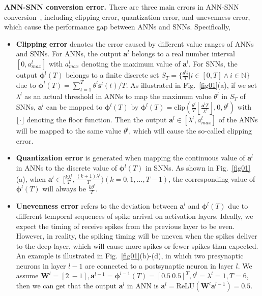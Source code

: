 \documentclass[letterpaper]{article} %
\begin{document}
\noindent
\textbf{ANN-SNN conversion error.}
There are three main errors in ANN-SNN conversion~\cite{bu2022optimal}, including clipping error, quantization error, and unevenness error, which cause the performance gap between ANNs and SNNs. Specifically,
\begin{itemize}
    \item[$\bullet$] \textbf{Clipping error} denotes the error caused by different value ranges of ANNs and SNNs. For ANNs, the output $\boldsymbol{a}^l$  belongs to a real number interval $[0,a_{max}^{l}]$ with $a_{max}^{l}$ denoting the maximum value of  $\boldsymbol{a}^l$. For SNNs,  the output $\boldsymbol{\phi}^l(T)$ belongs to a finite discrete set $S_T = \{ \frac{{\theta}^l i}{T} | i\in [0,T] \wedge  i\in \mathbb{N} \}$ due to $\boldsymbol{\phi}^l(T) = \sum\limits_{t=1}^T{\theta}^{l} \boldsymbol{s}^{l}(t) /T$. As illustrated in Fig.~\ref{fig01}(a), if we set $\lambda^l$ as an actual threshold in ANNs to map the maximum value ${\theta}^l$ in $S_T$ of SNNs, $\boldsymbol{a}^l$ can be mapped to $\boldsymbol{\phi}^l(T)$ by $\bm{\phi}^l(T)=\text{clip} \left(   \frac{ \theta^l}{T} \left \lfloor \frac{\bm{a}^{l} T}{\lambda^l}     \right \rfloor, 0, \theta^l  \right)$ with $\lfloor \cdot \rfloor$ denoting the floor function.
    Then the output $\boldsymbol{a}^l\in [\lambda^l, {a}_{max}^l]$ of the ANNs will be mapped to the same value ${\theta}^l$, which will cause the so-called clipping error.
    \item[$\bullet$] \textbf{Quantization error} is generated when mapping the continuous value of $\boldsymbol{a}^l$ in ANNs to the discrete value of $\boldsymbol{\phi}^l(T)$ in SNNs. As shown in Fig.~\ref{fig01}(a), when $\boldsymbol{a}^l\in[\frac{k\lambda^l}{T},\frac{(k+1)\lambda^l}{T})(k=0,1,...,T-1)$, the corresponding value of $\boldsymbol{\phi}^l(T)$ will always be $\frac{k{\theta}^l}{T}$.
    \item[$\bullet$] \textbf{Unevenness error} refers to the deviation between $\boldsymbol{a}^l$ and $\boldsymbol{\phi}^l(T)$ due to different temporal sequences of spike arrival on activation layers. Ideally, we expect the timing of receive spikes from the previous layer to be even. However, in reality, the spiking timing will be uneven when the spikes deliver to the deep layer, which will cause more spikes or fewer spikes than expected. An example is illustrated in Fig.~\ref{fig01}(b)-(d), in which two presynaptic neurons in layer $l-1$ are connected to a postsynaptic neuron in layer $l$. We assume $\boldsymbol{W}^l=\left[2\ -1\right], \boldsymbol{a}^{l-1} = \boldsymbol{\phi}^{l-1}(T) = \left[0.5\ 0.5\right]^T, {\theta}^l = \lambda^l = 1, T=6$, then we can get that the output $\boldsymbol{a}^{l}$ in ANN is $\boldsymbol{a}^{l}=\text{ReLU}(\boldsymbol{W}^l\boldsymbol{a}^{l-1})=0.5$.

\end{itemize}
\end{document}
